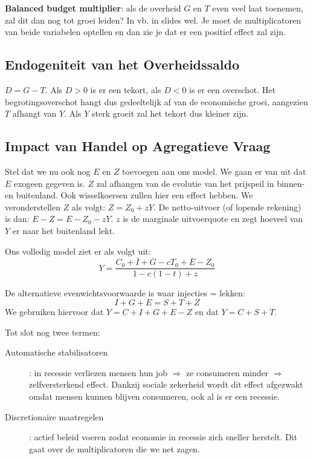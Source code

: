 \textbf{Balanced budget multiplier}: als de overheid $G$ en $T$ even veel laat toenemen, zal dit dan nog tot groei leiden? In vb. in slides wel. Je moet de multiplicatoren van beide variabelen optellen en dan zie je dat er een positief effect zal zijn.

\subsection{Endogeniteit van het Overheidssaldo}
$D = G - T$. Als $D> 0$ is er een tekort, als $D < 0 $ is er een overschot. Het begrotingsoverschot hangt dus gedeeltelijk af van de economische groei, aangezien $T$ afhangt van $Y$. Als $Y$ sterk groeit zal het tekort dus kleiner zijn.

\subsection{Impact van Handel op Agregatieve Vraag}
Stel dat we nu ook nog $E$ en $Z$ toevoegen aan ons model. We gaan er van uit dat $E$ exogeen gegeven is. $Z$ zal afhangen van de evolutie van het prijspeil in binnen- en buitenland. Ook wisselkoersen zullen hier een effect hebben. We veronderstellen $Z$ als volgt: $Z = Z_0 + zY$. De netto-uitvoer (of lopende rekening) is dan: $E - Z = E - Z_0 - zY$. $z$ is de marginale uitvoerquote en zegt hoeveel van $Y$ er naar het buitenland lekt.

Ons volledig model ziet er als volgt uit:
\begin{equation}
  Y = \frac{C_0 + \overline{I} + \overline{G} - cT_0 + \overline{E} - Z_0}{1-c(1-t) +z}
\end{equation}

De alternatieve evenwichtsvoorwaarde is waar injecties = lekken:
\begin{equation}
  I + G + E =  S + T + Z
\end{equation}
We gebruiken hiervoor dat $Y = C + I + G + E - Z$ en dat $ Y = C + S + T$.

Tot slot nog twee termen:
\begin{description}
  \item[Automatische stabilisatoren]: in recessie verliezen mensen hun job $\Rightarrow$ ze consumeren minder $\Rightarrow$ zelfversterkend effect. Dankzij sociale zekerheid wordt dit effect afgezwakt omdat mensen kunnen blijven consumeren, ook al is er een recessie.
  \item[Discretionaire maatregelen]: actief beleid voeren zodat economie in recessie zich sneller herstelt. Dit gaat over de multiplicatoren die we net zagen.
\end{description}
